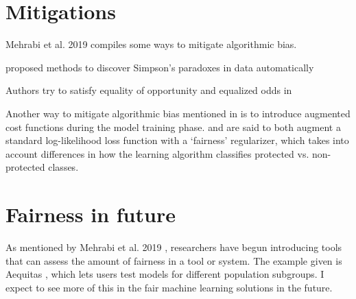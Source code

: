 \documentclass[conference]{IEEEtran}
\begin{document}
\section{Mitigations}
Mehrabi et al. 2019 \cite{DBLP:journals/corr/abs-1908-09635} compiles some ways to mitigate algorithmic bias.

\cite{DBLP:journals/corr/abs-1801-04385, DBLP:journals/corr/abs-1805-03094} proposed methods to discover
Simpson’s paradoxes in data automatically

Authors try to satisfy equality of opportunity and equalized odds in \cite{DBLP:journals/corr/HardtPS16}

Another way to mitigate algorithmic bias mentioned in \cite{d_Alessandro_2017} is to introduce augmented cost functions during the model training phase. \cite{article} and \cite{DBLP:journals/corr/Zliobaite15} are said to both augment a standard log-likelihood loss function with a ‘fairness’ regularizer, which takes into account differences in how the learning algorithm classifies protected vs. non-protected classes.

\section{Fairness in future}
As mentioned by Mehrabi et al. 2019 \cite{DBLP:journals/corr/abs-1908-09635}, researchers have begun introducing tools that can assess the amount of fairness in a tool or system. The example given is Aequitas \cite{DBLP:journals/corr/abs-1811-05577}, which lets users test models for different population subgroups. I expect to see more of this in the fair machine learning solutions in the future.



\end{document}
